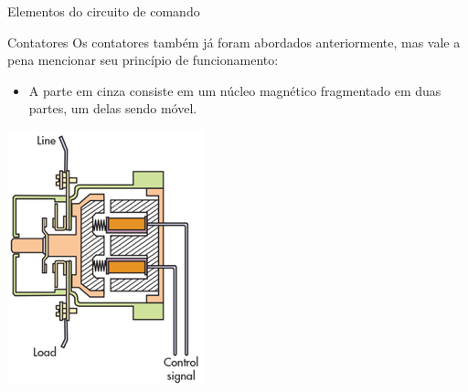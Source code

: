 \begin{frame}{Elementos do circuito de comando}
\begin{block}{Contatores}
	Os contatores também já foram abordados anteriormente, mas vale a pena mencionar seu princípio de funcionamento:
	\begin{itemize}
		\item A parte em cinza consiste em um núcleo magnético fragmentado em duas partes, um delas sendo móvel.
	\end{itemize}
\end{block}

\centerline{\includegraphics[width=0.3\linewidth]{Figuras/Ch06/fig8.jpg}}
\end{frame}

